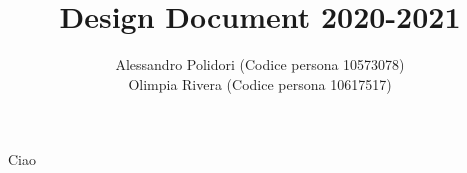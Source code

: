 \documentclass{article}
\title{ Design Document 2020-2021}
\author{Alessandro Polidori (Codice persona 10573078)\\Olimpia Rivera (Codice persona 10617517)}
\date{}
\begin{document}
\maketitle
\tableofcontents{}

Ciao
\end{document}
